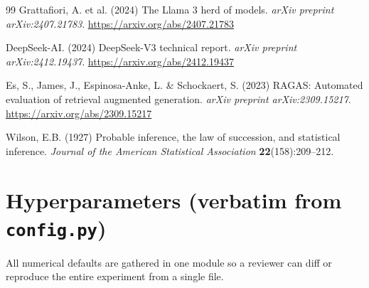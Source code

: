 \documentclass{article}
\begin{document}
\begin{thebibliography}{99}
Grattafiori, A. et al. (2024) The Llama 3 herd of models. \emph{arXiv
preprint arXiv:2407.21783}. \url{https://arxiv.org/abs/2407.21783}

DeepSeek-AI. (2024) DeepSeek-V3 technical report. \emph{arXiv preprint
arXiv:2412.19437}. \url{https://arxiv.org/abs/2412.19437}

Es, S., James, J., Espinosa-Anke, L. \& Schockaert, S. (2023) RAGAS:
Automated evaluation of retrieval augmented generation. \emph{arXiv
preprint arXiv:2309.15217}. \url{https://arxiv.org/abs/2309.15217}

Wilson, E.B. (1927) Probable inference, the law of succession, and
statistical inference. \emph{Journal of the American Statistical
Association} \textbf{22}(158):209--212.

\end{thebibliography}

\appendix

\section{Hyperparameters (verbatim from \texttt{config.py})}
\label{app:hyper}

All numerical defaults are gathered in one module so a reviewer can
diff or reproduce the entire experiment from a single file.
\end{document}
